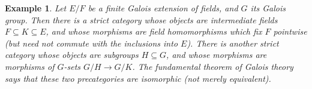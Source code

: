 \documentclass[12pt]{article}
\newcounter{mathcount}
\newtheorem{preeg}{Example}
\newenvironment{eg}{\begin{preeg}}{\end{preeg}\addtocounter{mathcount}{1}}
\begin{document}
\begin{eg}\label{ct:galois}
  Let $E/F$ be a finite Galois extension
  of fields, and $G$ its Galois group.
  Then there is a strict category whose objects are intermediate fields $F\subseteq K\subseteq E$, and whose morphisms are field homomorphisms which fix $F$ pointwise (but need not commute with the inclusions into $E$).
  There is another strict category whose objects are subgroups $H\subseteq G$, and whose morphisms are morphisms of $G$-sets $G/H \to G/K$.
  The fundamental theorem of Galois theory
  says that these two precategories are isomorphic (not merely equivalent).
\end{eg}

%
\end{document}
